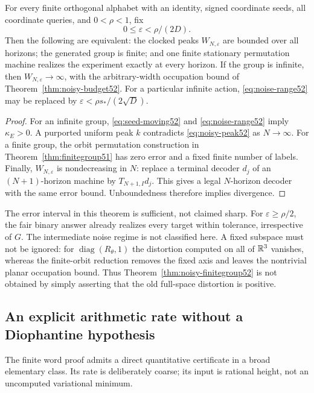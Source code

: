 \begin{theorem}
\label{thm:noisy-finitegroup52}
For every finite orthogonal alphabet with an identity, signed
coordinate seeds, all coordinate queries, and $0<\rho<1$, fix
\begin{equation}\label{eq:noise-range52}
                    0\le\varepsilon<\rho/(2D).
\end{equation}
Then the following are equivalent: the clocked peaks $W_{N,\varepsilon}$
are bounded over all horizons; the generated group is finite; and
one finite stationary permutation machine realizes the experiment
exactly at every horizon. If the group is infinite, then
$W_{N,\varepsilon}\to\infty$, with the arbitrary-width occupation
bound of Theorem~\ref{thm:noisy-budget52}.
For a particular infinite action, \eqref{eq:noise-range52} may be
replaced by $\varepsilon<\rho s_*/(2\sqrt D)$.
\end{theorem}
\begin{proof}
For an infinite group, \eqref{eq:seed-moving52} and
\eqref{eq:noise-range52} imply $\kappa_E>0$. A purported uniform
peak $k$ contradicts \eqref{eq:noisy-peak52} as $N\to\infty$.
For a finite group, the orbit permutation construction in
Theorem~\ref{thm:finitegroup51} has zero error and a fixed finite
number of labels. Finally, $W_{N,\varepsilon}$ is nondecreasing in
$N$: replace a terminal decoder $d_j$ of an $(N+1)$-horizon machine
by $T_{N+1,I}d_j$. This gives a legal $N$-horizon decoder with the
same error bound. Unboundedness therefore implies divergence.
\end{proof}

The error interval in this theorem is sufficient, not claimed sharp.
For $\varepsilon\ge\rho/2$, the fair binary answer already realizes
every target within tolerance, irrespective of $G$. The intermediate
noise regime is not classified here. A fixed subspace must not be
ignored: for $\operatorname{diag}(R_\theta,1)$ the distortion computed
on all of $\mathbb R^3$ vanishes, whereas the finite-orbit reduction removes
the fixed axis and leaves the nontrivial planar occupation bound.
Thus Theorem~\ref{thm:noisy-finitegroup52} is not obtained by simply
asserting that the old full-space distortion is positive.

\subsection{An explicit arithmetic rate without a Diophantine hypothesis}
The finite word proof admits a direct quantitative certificate in a
broad elementary class. Its rate is deliberately coarse; its input
is rational height, not an uncomputed variational minimum.

